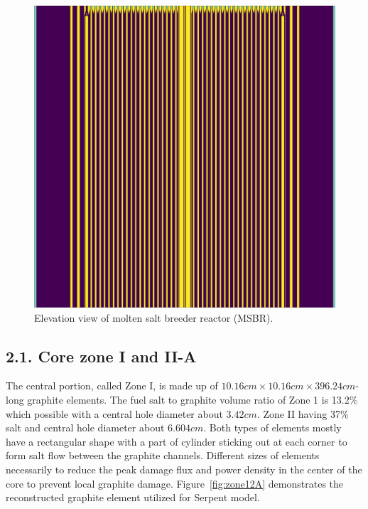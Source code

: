 \documentclass{anstrans}
\begin{document}
\begin{figure}[ht] %
  \centering
  \includegraphics[width=\linewidth]{figure_2_2.png}
  \caption{Elevation view of molten salt breeder reactor (MSBR).}
  \label{fig:elevation}
\end{figure}

\subsection{2.1. Core zone I and II-A}
The central portion, called Zone I, is made up of $10.16cm\times10.16cm\times396.24cm$-long graphite elements. The fuel salt to graphite volume ratio of Zone 1 is 13.2\% which possible with a central hole diameter about $3.42cm$. Zone II having 37\% salt and central hole diameter about $6.604cm$. Both types of elements mostly have a rectangular shape with a part of cylinder sticking out at each corner to form salt flow between the graphite channels. Different sizes of elements necessarily to reduce the peak damage flux and power density in the center of the core to prevent local graphite damage. Figure~\ref{fig:zone12A} demonstrates the reconstructed graphite element utilized for Serpent model.
\end{document}
